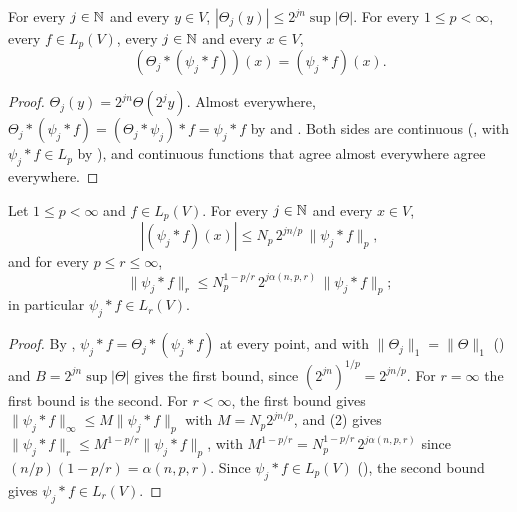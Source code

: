 \begin{lemma}
\label{lem:blocks-band-limited-pointwise}
\leanok
{}
For every $j \in \mathbb{N}$ and every $y \in V$, $|\Theta_j(y)| \leq 2^{jn} \sup |\Theta|$. For every
$1 \leq p < \infty$, every $f \in L_p(V)$, every $j \in \mathbb{N}$ and every $x \in V$,
\[
  (\Theta_j * (\psi_j * f))(x) = (\psi_j * f)(x) .
\]
\end{lemma}

\begin{proof}
\leanok
$\Theta_j(y) = 2^{jn} \Theta(2^j y)$. Almost everywhere,
$\Theta_j * (\psi_j * f) = (\Theta_j * \psi_j) * f = \psi_j * f$ by  and
. Both sides are continuous (,
with $\psi_j * f \in L_p$ by ), and continuous functions that agree
almost everywhere agree everywhere.
\end{proof}

\begin{theorem}
\label{thm:nikolskii-blocks}
\leanok
{}
Let $1 \leq p < \infty$ and $f \in L_p(V)$. For every $j \in \mathbb{N}$ and every $x \in V$,
\[
  |(\psi_j * f)(x)| \leq N_p \, 2^{jn/p} \, \|\psi_j * f\|_p ,
\]
and for every $p \leq r \leq \infty$,
\[
  \|\psi_j * f\|_r \leq N_p^{1 - p/r} \, 2^{j \alpha(n, p, r)} \, \|\psi_j * f\|_p ;
\]
in particular $\psi_j * f \in L_r(V)$.
\end{theorem}

\begin{proof}
\leanok
{}
By , $\psi_j * f = \Theta_j * (\psi_j * f)$ at every
point, and  with $\|\Theta_j\|_1 = \|\Theta\|_1$
() and $B = 2^{jn} \sup |\Theta|$ gives the first bound, since
$(2^{jn})^{1/p} = 2^{jn/p}$. For $r = \infty$ the first bound is the second. For $r < \infty$,
the first bound gives $\|\psi_j * f\|_\infty \leq M \|\psi_j * f\|_p$ with $M = N_p 2^{jn/p}$,
and (2) gives
$\|\psi_j * f\|_r \leq M^{1 - p/r} \|\psi_j * f\|_p$, with
$M^{1 - p/r} = N_p^{1 - p/r} \, 2^{j \alpha(n, p, r)}$ since $(n/p)(1 - p/r) = \alpha(n, p, r)$.
Since $\psi_j * f \in L_p(V)$
(), the second bound gives $\psi_j * f \in L_r(V)$.
\end{proof}

